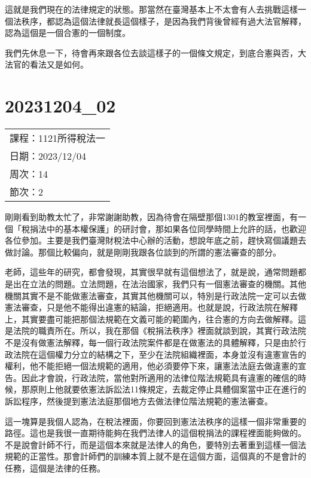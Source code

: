 \documentclass[]{ctexbook}
\begin{document}
這就是我們現在的法律規定的狀態。那當然在臺灣基本上不太會有人去挑戰這樣一個法秩序，都認為這個法律就長這個樣子，是因為我們背後曾經有過大法官解釋，認為這個是一個合憲的一個制度。

我們先休息一下，待會再來跟各位去談這樣子的一個條文規定，到底合憲與否，大法官的看法又是如何。

\hypertarget{section-26}{%
\chapter{20231204\_02}\label{section-26}}

\begin{longtable}[]{@{}l@{}}
\toprule()
\endhead
課程：1121所得稅法一 \\
日期：2023/12/04 \\
周次：14 \\
節次：2 \\
\bottomrule()
\end{longtable}

剛剛看到助教太忙了，非常謝謝助教，因為待會在隔壁那個1301的教室裡面，有一個「稅捐法中的基本權保護」的研討會，那如果各位同學時間上允許的話，也歡迎各位參加。主要是我們臺灣財稅法中心辦的活動，想說年底之前，趕快寫個議題去做討論。那個比較偏向，就是剛剛我跟各位談到的所謂的憲法審查的部分。

老師，這些年的研究，都會發現，其實很早就有這個想法了，就是說，通常問題都是出在立法的問題。立法問題，在法治國家，我們只有一個憲法審查的機關。其他機關其實不是不能做憲法審查，其實其他機關可以，特別是行政法院一定可以去做憲法審查，只是他不能得出違憲的結論，拒絕適用。也就是說，行政法院在解釋上，其實要盡可能把那個法規範在文義可能的範圍內，往合憲的方向去做解釋。這是法院的職責所在。所以，我在那個《稅捐法秩序》裡面就談到說，其實行政法院不是沒有做憲法解釋，每一個行政法院案件都是在做憲法的具體解釋，只是由於行政法院在這個權力分立的結構之下，至少在法院組織裡面，本身並沒有違憲宣告的權利，他不能拒絕一個法規範的適用，他必須要停下來，讓憲法法庭去做違憲的宣告。因此才會說，行政法院，當他對所適用的法律位階法規範具有違憲的確信的時候，那原則上他就要依憲法訴訟法11條規定，去裁定停止具體個案當中正在進行的訴訟程序，然後提到憲法法庭那個地方去做法律位階法規範的憲法審查。

這一塊算是我個人認為，在稅法裡面，你要回到憲法法秩序的這樣一個非常重要的路徑。這也是我很一直期待能夠在我們法律人的這個稅捐法的課程裡面能夠做的。不是說會計師不行，而是這個本來就是法律人的角色，要特別去著重到這樣一個法規範的正當性。那會計師們的訓練本質上就不是在這個方面，這個真的不是會計的任務，這個是法律的任務。
\end{document}
